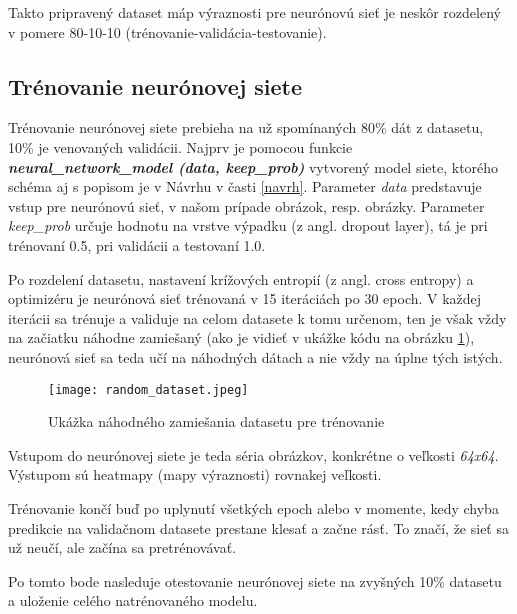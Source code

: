 Takto pripravený dataset máp výraznosti pre neurónovú sieť je neskôr rozdelený v pomere 80-10-10 (trénovanie-validácia-testovanie).

\subsection{Trénovanie neurónovej siete}

Trénovanie neurónovej siete prebieha na už spomínaných 80\% dát z datasetu, 10\% je venovaných validácii. Najprv je pomocou funkcie \textit{\textbf{neural\_network\_model (data, keep\_prob)}} vytvorený model siete, ktorého schéma aj s popisom je v Návrhu v časti \ref{navrh}. Parameter \textit{data} predstavuje vstup pre neurónovú sieť, v našom prípade obrázok, resp. obrázky. Parameter \textit{keep\_prob} určuje hodnotu na vrstve výpadku (z angl. dropout layer), tá je pri trénovaní 0.5, pri validácii a testovaní 1.0. 

Po rozdelení datasetu, nastavení krížových entropií (z angl. cross entropy) a optimizéru je neurónová sieť trénovaná v 15 iteráciách po 30 epoch. V každej iterácii sa trénuje a validuje na celom datasete k tomu určenom, ten je však vždy na začiatku náhodne zamiešaný (ako je vidieť v ukážke kódu na obrázku \ref{fig:shuffle_dataset}), neurónová sieť sa teda učí na náhodných dátach a nie vždy na úplne tých istých.  

	\begin{figure}[H]
		
		\begin{center}
			\texttt{[image: random\_dataset.jpeg]}
		\end{center}
		\caption[Ukážka náhodného zamiešania datasetu pre trénovanie]{Ukážka náhodného zamiešania datasetu pre trénovanie}\label{fig:shuffle_dataset}
	\end{figure}
	
Vstupom do neurónovej siete je teda séria obrázkov, konkrétne o veľkosti \textit{64x64}. Výstupom sú heatmapy (mapy výraznosti) rovnakej veľkosti. 
	

Trénovanie končí buď po uplynutí všetkých epoch alebo v momente, kedy chyba predikcie na validačnom datasete prestane klesať a začne rásť. To značí, že sieť sa už neučí, ale začína sa pretrénovávať. 

Po tomto bode nasleduje otestovanie neurónovej siete na zvyšných 10\% datasetu a uloženie celého natrénovaného modelu. 

